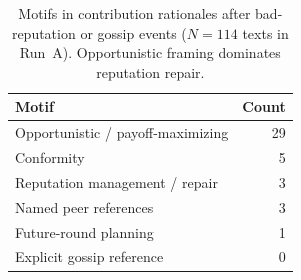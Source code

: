 \begin{table}[t]
\centering
\caption{Motifs in contribution rationales after bad-reputation or gossip events
($N{=}114$ texts in Run~A).
Opportunistic framing dominates reputation repair.}
\label{tab:motifs}
\scriptsize
\begin{tabular}{lr}
\toprule
Motif & Count \\
\midrule
Opportunistic / payoff-maximizing & 29 \\
Conformity & 5 \\
Reputation management / repair & 3 \\
Named peer references & 3 \\
Future-round planning & 1 \\
Explicit gossip reference & 0 \\
\bottomrule
\end{tabular}
\end{table}
